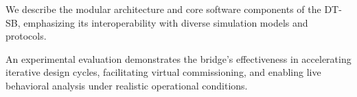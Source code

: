 We describe the modular architecture and core software components of the DT-SB, emphasizing its interoperability with diverse simulation models and protocols.

An experimental evaluation demonstrates the bridge’s effectiveness in accelerating iterative design cycles, facilitating virtual commissioning, and enabling live behavioral analysis under realistic operational conditions.


